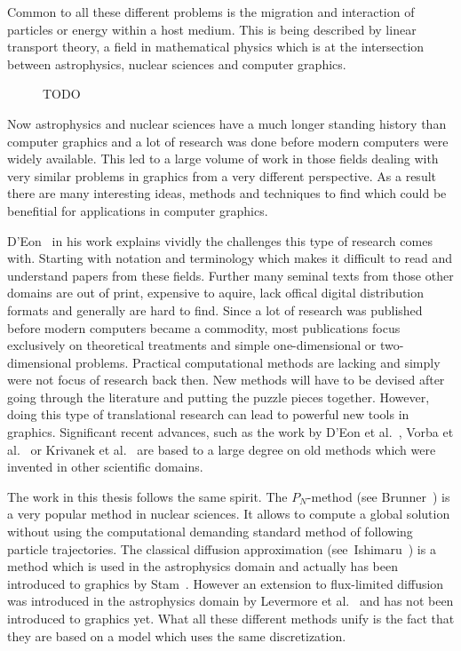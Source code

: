 Common to all these different problems is the migration and interaction of particles or energy within a host medium. This is being described by linear transport theory, a field in mathematical physics which is at the intersection between astrophysics, nuclear sciences and computer graphics.
\begin{figure}[ht]
\centering
{}
\caption{TODO}
\label{fig:intro_linear_transport_fields}
\end{figure}

Now astrophysics and nuclear sciences have a much longer standing history than computer graphics and a lot of research was done before modern computers were widely available. This led to a large volume of work in those fields dealing with very similar problems in graphics from a very different perspective. As a result there are many interesting ideas, methods and techniques to find which could be benefitial for applications in computer graphics.

D'Eon~\cite{DEon14} in his work explains vividly the challenges this type of research comes with. Starting with notation and terminology which makes it difficult to read and understand papers from these fields. Further many seminal texts from those other domains are out of print, expensive to aquire, lack offical digital distribution formats and generally are hard to find. Since a lot of research was published before modern computers became a commodity, most publications focus exclusively on theoretical treatments and simple one-dimensional or two-dimensional problems. Practical computational methods are lacking and simply were not focus of research back then. New methods will have to be devised after going through the literature and putting the puzzle pieces together. However, doing this type of translational research can lead to powerful new tools in graphics. Significant recent advances, such as the work by D'Eon et al.~\cite{dEon11}, Vorba et al.~\cite{Vorba16} or Krivanek et al.~\cite{Krivanek14} are based to a large degree on old methods which were invented in other scientific domains.

The work in this thesis follows the same spirit. The $P_N$-method (see Brunner~\cite{Brunner02}) is a very popular method in nuclear sciences. It allows to compute a global solution without using the computational demanding standard method of following particle trajectories. The classical diffusion approximation (see~Ishimaru~\cite{Ishimaru78}) is a method which is used in the astrophysics domain and actually has been introduced to graphics by Stam~\cite{Stam95}. However an extension to flux-limited diffusion was introduced in the astrophysics domain by Levermore et al.~\cite{Levermore81} and has not been introduced to graphics yet. What all these different methods unify is the fact that they are based on a model which uses the same discretization.

